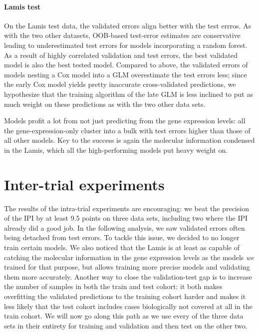 \paragraph{Lamis test}

On the Lamis test data, the validated errors align better with the test errros. As with the two other 
datasets, OOB-based test-error estimates are conservative leading to underestimated test errors 
for models incorporating a random forest. As a result of highly correlated validation and test 
errors, the best validated model is also the best tested model. Compared to above, the validated errors 
of models nesting a Cox model into a GLM overestimate the test errors less; since the early Cox 
model yields pretty inaccurate cross-validated predictions, we hypothesize that the training 
algorithm of the late GLM is less inclined to put as much weight on these predictions as with the 
two other data sets.

Models profit a lot from not just predicting from the gene expression levels: all the 
gene-expression-only cluster into a bulk with test errors higher than those of all other models. 
Key to the success is again the molecular information condensed in the Lamis, which all the 
high-performing models put heavy weight on.

\section{Inter-trial experiments}

The results of the intra-trial experiments are encouraging: we beat the precision of the IPI by 
at least \num{9.5} points on three data sets, including two where the IPI already did a good job. 
In the following analysis, we saw validated errors often being detached from test errors. To tackle 
this issue, we decided to no longer train certain models. We also noticed that the Lamis is at least 
as capable of catching the molecular information in the gene expression levels as the models
\textit{we} trained for that purpose, but allows training more precise models and validating them 
more accurately. Another way to close the validation-test gap is to increase the number of samples 
in both the train and test cohort: it both makes overfitting the validated predictions to the 
training cohort harder and makes it less likely that the test cohort includes cases biologically 
not covered at all in the train cohort. We will now go along this path as we use every of the 
three data sets in their entirety for training and validation and then test on the other two.

